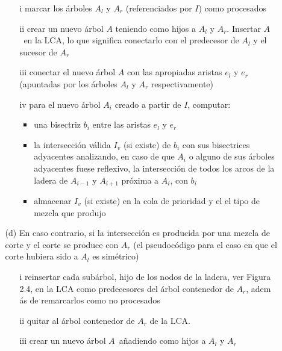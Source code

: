 \documentclass[12pt,english]{report}
\begin{document}
\begin{itemize}
\begin{itemize}
\begin{itemize}
\item[i] marcar los \'{a}rboles $A_{l}$ y $A_{r}$ (referenciados por $I$)
como procesados

\item[ii] crear un nuevo \'{a}rbol $A$ teniendo como hijos a $A_{l}$ y $A_{r}
$. Insertar $A$\ en la LCA, lo que significa conectarlo con el predecesor de 
$A_{l}$ y el sucesor de $A_{r}$

\item[iii] conectar el nuevo \'{a}rbol $A$ con las apropiadas aristas $e_{l}$
y $e_{r}$ (apuntadas por los \'{a}rboles $A_{l}$ y $A_{r}$ respectivamente)

\item[iv] para el nuevo \'{a}rbol $A_{i}$ creado a partir de $I$, computar: 

\begin{itemize}
\item una bisectriz $b_{i}$ entre las aristas $e_{l}$ y $e_{r}$

\item la intersecci\'{o}n v\'{a}lida $I_{v}$ (si existe) de $b_{i}$ con sus
bisectrices adyacentes analizando, en caso de que $A_{i}$ o alguno de sus 
\'{a}rboles adyacentes fuese reflexivo, la intersecci\'{o}n de todos los
arcos de la ladera de $A_{i-1}$ y $A_{i+1}$ pr\'{o}xima a $A_{i}$, con $b_{i}$

\item almacenar $I_{v}$ (si existe) en la cola de prioridad y el el tipo de
mezcla que produjo
\end{itemize}
\end{itemize}

\item[(d)] En caso contrario, si la intersecci\'{o}n es producida por una
mezcla de corte y el corte se produce con $A_r$ (el pseudoc\'{o}digo para el
caso en que el corte hubiera sido a $A_{l}$ es sim\'{e}trico) 

\begin{itemize}
\item[i] reinsertar cada sub\'{a}rbol, hijo de los nodos de la ladera, ver
Figura 2.4, en la LCA como predecesores del \'{a}rbol contenedor de $A_{r}$, adem%
\'{a}s de remarcarlos como no procesados

\item[ii] quitar al \'{a}rbol contenedor de $A_{r}$ de la LCA.  

\item[iii] crear un nuevo \'{a}rbol $A$\ a\~{n}adiendo como hijos a $A_{l}$
y $A_{r}$


\end{itemize}
\end{itemize}
\end{itemize}
\end{document}
